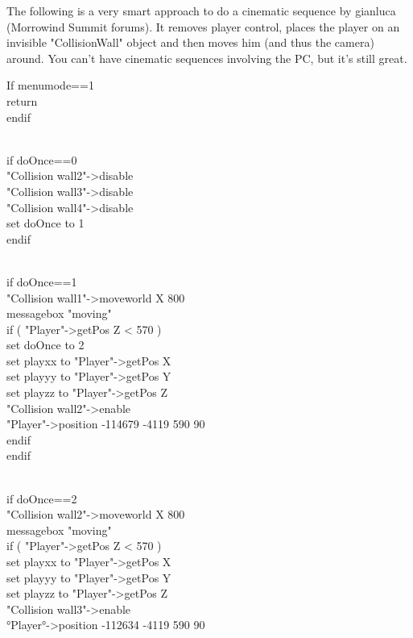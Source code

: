 \documentclass[
]{article}
\begin{document}
The following is a very smart approach to do a cinematic sequence by
gianluca (Morrowind Summit forums). It removes player control, places
the player on an invisible "CollisionWall" object and then moves him
(and thus the camera) around. You can't have cinematic sequences
involving the PC, but it's still great.

If menumode==1\\
return\\
endif\\
\strut \\
if doOnce==0\\
"Collision wall2"-\textgreater disable\\
"Collision wall3"-\textgreater disable\\
"Collision wall4"-\textgreater disable\\
set doOnce to 1\\
endif\\
\strut \\
if doOnce==1\\
"Collision wall1"-\textgreater moveworld X 800\\
messagebox "moving"\\
if ( "Player"-\textgreater getPos Z \textless{} 570 )\\
set doOnce to 2\\
set playxx to "Player"-\textgreater getPos X\\
set playyy to "Player"-\textgreater getPos Y\\
set playzz to "Player"-\textgreater getPos Z\\
"Collision wall2"-\textgreater enable\\
"Player"-\textgreater position -114679 -4119 590 90\\
endif\\
endif\\
\strut \\
if doOnce==2\\
"Collision wall2"-\textgreater moveworld X 800\\
messagebox "moving"\\
if ( "Player"-\textgreater getPos Z \textless{} 570 )\\
set playxx to "Player"-\textgreater getPos X\\
set playyy to "Player"-\textgreater getPos Y\\
set playzz to "Player"-\textgreater getPos Z\\
"Collision wall3"-\textgreater enable\\
°Player°-\textgreater position -112634 -4119 590 90\\
\end{document}
